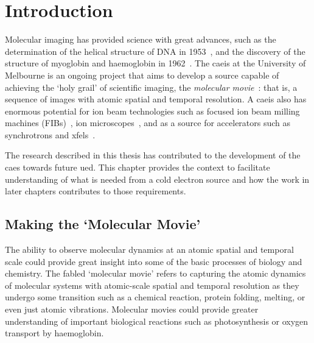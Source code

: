 \chapter{Introduction}
 
\setcounter{page}{1}

Molecular imaging has provided science with great advances, such as the determination of the helical structure of DNA in 1953~\cite{watson_molecular_1953}, and the discovery of the structure of myoglobin and haemoglobin in 1962~\cite{kendrew_x-ray_1957}.
The \gls{caeis} at the University of Melbourne is an ongoing project that aims to develop a source capable of achieving the `holy grail' of scientific imaging, the \emph{molecular movie}~\cite{dwyer_femtosecond_2006,sciaini_femtosecond_2011}: that is, a sequence of images with atomic spatial and temporal resolution.
A \gls{caeis} also has enormous potential for ion beam technologies such as focused ion beam milling machines (FIBs)~\cite{mcclelland_bright_2016}, ion microscopes~\cite{knuffman_cold_2013}, and as a source for accelerators such as synchrotrons and \glspl{xfel}~\cite{van_oudheusden_electron_2007,zhu_future_2015,mcculloch_cold_2016}.

The research described in this thesis has contributed to the development of the \gls{caes} towards future \gls{ued}.
This chapter provides the context to facilitate understanding of what is needed from a cold electron source and how the work in later chapters contributes to those requirements.

\section{Making the `Molecular Movie'}

The ability to observe molecular dynamics at an atomic spatial and temporal scale could provide great insight into some of the basic processes of biology and chemistry.
The fabled `molecular movie' refers to capturing the atomic dynamics of molecular systems with atomic-scale spatial and temporal resolution as they undergo some transition such as a chemical reaction, protein folding, melting, or even just atomic vibrations.
Molecular movies could provide greater understanding of important biological reactions such as photosynthesis or oxygen transport by haemoglobin.

